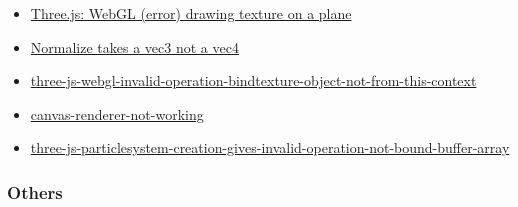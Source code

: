 \begin{itemize}
\tightlist
\item
  \href{http://stackoverflow.com/questions/24635753/three-js-webgl-error-drawing-texture-on-a-plane}{Three.js:
  WebGL (error) drawing texture on a plane}
\item
  \href{http://stackoverflow.com/questions/14842857/normalize-function-in-webgl-not-working-three-js}{Normalize
  takes a vec3 not a vec4}
\item
  \href{http://stackoverflow.com/questions/29059306/three-js-webgl-invalid-operation-bindtexture-object-not-from-this-context}{three-js-webgl-invalid-operation-bindtexture-object-not-from-this-context}
\item
  \href{http://stackoverflow.com/questions/30074972/canvas-renderer-not-working}{canvas-renderer-not-working}
\item
  \href{http://stackoverflow.com/questions/11359152/three-js-particlesystem-creation-gives-invalid-operation-not-bound-buffer-array}{three-js-particlesystem-creation-gives-invalid-operation-not-bound-buffer-array}
\end{itemize}

\subsubsection{Others}\label{others}

